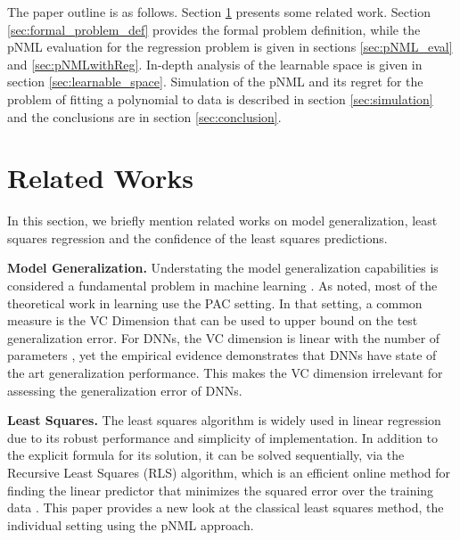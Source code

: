 \documentclass[conference,letterpaper]{IEEEtran}
\begin{document}
The paper outline is as follows.
Section \ref{sec:related_works} presents some related work. 
Section \ref{sec:formal_problem_def} provides the formal problem definition, while the pNML evaluation for the regression problem is given in sections \ref{sec:pNML_eval} and \ref{sec:pNMLwithReg}. 
In-depth analysis of the learnable space is given in section \ref{sec:learnable_space}. 
Simulation of the pNML and its regret for the problem of fitting a polynomial to data is described in section \ref{sec:simulation} and the conclusions are in section \ref{sec:conclusion}.

\section{Related Works} \label{sec:related_works}
In this section, we briefly mention related works on model generalization, least squares regression and the confidence of the least squares predictions.

\textbf{Model Generalization.} 
Understating the model generalization capabilities is considered a fundamental problem in machine learning  \cite{vapnik2013nature}. 
As noted, most of the theoretical work in learning use the PAC setting. In that setting, a common measure is the VC Dimension that can be used to upper bound on the test generalization error.
For DNNs, the VC dimension is linear with the number of parameters \cite{sontag1998vc}, yet the empirical evidence demonstrates that DNNs have state of the art generalization performance. This makes the VC dimension irrelevant for assessing the generalization error of DNNs.

\textbf{Least Squares.}
The least squares algorithm is widely used in linear regression due to its robust performance and simplicity of implementation.
In addition to the explicit formula for its solution, it can be solved sequentially, via the Recursive Least Squares (RLS) algorithm, which is an efficient online method for finding the linear predictor that minimizes the squared error over the training data \cite{hayes19969}.
This paper provides a new look at the classical least squares method, the individual setting using the pNML approach.
\end{document}
